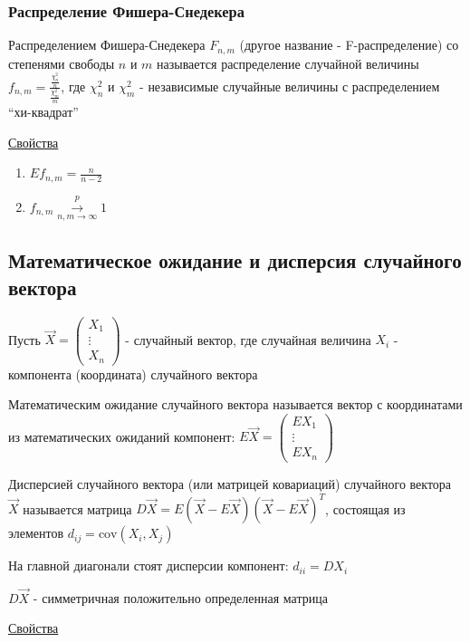 \documentclass[12pt]{article}
\begin{document}
\subsubsection{Распределение Фишера-Снедекера}

\Def Распределением Фишера-Снедекера $F_{n,m}$ (другое название - F-распределение) со степенями свободы $n$ и $m$ называется распределение случайной величины 
$f_{n,m} = \frac{\frac{\chi^2_n}{n}}{\frac{\chi^2_m}{m}}$, где $\chi_n^2$ и $\chi_m^2$ - независимые случайные величины с распределением \enquote{хи-квадрат}

\underline{Свойства}

\begin{enumerate}
    \item $E f_{n,m} = \frac{n}{n - 2}$

    \item $f_{n,m} \overset{p}{\underset{n, m \to \infty}{\longrightarrow}} 1$
\end{enumerate}


\subsection{Математическое ожидание и дисперсия случайного вектора}

Пусть $\vec X = \begin{pmatrix}X_1 \\ \vdots \\ X_n\end{pmatrix}$ - случайный вектор, 
где случайная величина $X_i$ - компонента (координата) случайного вектора

\Def Математическим ожидание случайного вектора называется вектор с координатами из математических ожиданий компонент: 
$E \vec X = \begin{pmatrix}E X_1 \\ \vdots \\ E X_n\end{pmatrix}$

\Def Дисперсией случайного вектора (или матрицей ковариаций) случайного вектора $\vec X$ называется
матрица $D \vec X = E (\vec X - E \vec X) (\vec X - E \vec X)^T$, состоящая из элементов $d_{ij} = \mathrm{cov} (X_i, X_j)$

\Notas На главной диагонали стоят дисперсии компонент: $d_{ii} = D X_i$

\Notas $D \vec X$ - симметричная положительно определенная матрица

\underline{Свойства}
\end{document}
